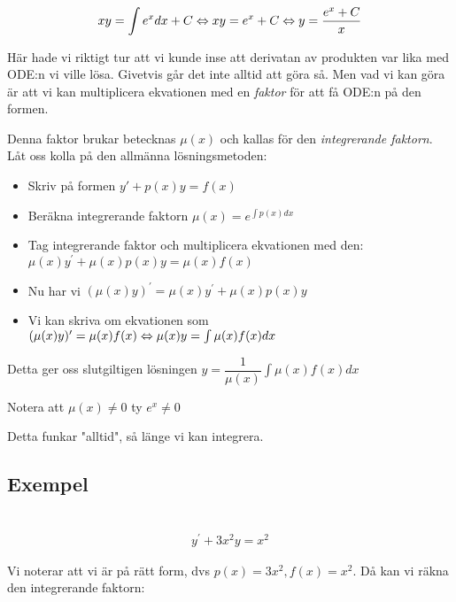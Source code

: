 \begin{equation*}
  \begin{gathered}
    xy = \int e^x dx +C \Leftrightarrow xy=e^x+C \Leftrightarrow y = \dfrac{e^x+C}{x}
  \end{gathered}
\end{equation*}
\par\bigskip

\noindent Här hade vi riktigt tur att vi kunde inse att derivatan av produkten var lika med ODE:n vi ville lösa. Givetvis går det inte alltid att göra så. Men vad vi kan göra är att vi kan multiplicera ekvationen med en \textit{faktor} för att få ODE:n på den formen.
\par\bigskip
\noindent Denna faktor brukar betecknas $\mu(x)$ och kallas för den \textit{integrerande faktorn}. Låt oss kolla på den allmänna lösningsmetoden:
\par\bigskip

\begin{itemize}
  \item Skriv på formen $y\prime+p(x)y=f(x)$
  \item Beräkna integrerande faktorn $\mu(x) = e^{\int p(x)dx}$
  \item Tag integrerande faktor och multiplicera ekvationen med den: $\mu(x)y^{\prime}+\mu(x)p(x)y=\mu(x)f(x)$
  \item Nu har vi $(\mu(x)y)^{\prime}= \mu(x)y^{\prime}+\mu(x)p(x)y$
  \item Vi kan skriva om ekvationen som $(\mu(x)y)^{\prime}=\mu(x)f(x)\Leftrightarrow \mu(x)y = \int\mu(x)f(x)dx$
\end{itemize}
\par\bigskip
\noindent Detta ger oss slutgiltigen lösningen $y=\dfrac{1}{\mu(x)}\int\mu(x)f(x)dx$
\par\bigskip
\noindent Notera att $\mu(x)\neq0$ ty $e^x\neq0$
\par\bigskip
\noindent Detta funkar "alltid", så länge vi kan integrera.

\subsection{Exempel}\hfill\\


\begin{equation*}
  \begin{gathered}
    y^{\prime}+3x^2y=x^2
  \end{gathered}
\end{equation*}
\par\bigskip
\noindent Vi noterar att vi är på rätt form, dvs $p(x)=3x^2, f(x)=x^2$. Då kan vi räkna den integrerande faktorn:

